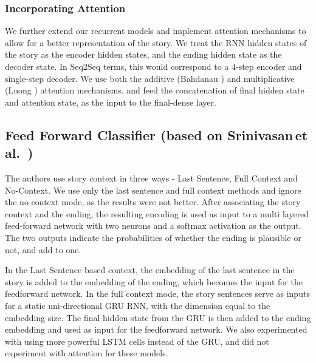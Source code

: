 \documentclass{article}
\begin{document}
\subsubsection{Incorporating Attention}
We further extend our recurrent models and implement attention mechanisms to allow for a better representation of the story. We treat the RNN hidden states of the story as the encoder hidden states, and the ending hidden state as the decoder state. In Seq2Seq terms, this would correspond to a 4-step encoder and single-step decoder. We use both the additive (Bahdanau \citep{Bahdanau2016End-to-EndRecognition}) and multiplicative (Luong \citep{Luong2015EffectiveTranslation}) attention mechanisms. and feed the concatenation of final hidden state and attention state, as the input to the final-dense layer.

\subsection{Feed Forward Classifier (based on Srinivasan\,et\,al.\ \citep{Srinivasan2018ATest})}
The authors use story context in three ways - Last Sentence, Full Context and No-Context. We use only the last sentence and full context methods and ignore the no context mode, as the results were not better. After associating the story context and the ending, the resulting encoding is used as input to a multi layered feed-forward network with two neurons and a softmax activation as the output. The two outputs indicate the probabilities of whether the ending is plausible or not, and add to one.

In the Last Sentence based context, the embedding of the last sentence in the story is added to the embedding of the ending, which becomes the input for the feedforward network. In the full context mode, the story sentences serve as inputs for a static uni-directional GRU RNN, with the dimension equal to the embedding size. The final hidden state from the GRU is then added to the ending embedding and used as input for the feedforward network. We also experimented with using more powerful LSTM cells instead of the GRU, and did not experiment with attention for these models.
\end{document}
